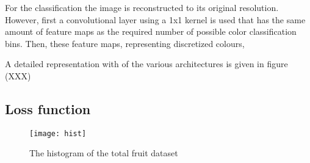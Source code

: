 {For the classification the image is reconstructed to its original resolution. However, first a convolutional layer using a 1x1 kernel is used that has the same amount of feature maps as the required number of possible color classification bins. Then, these feature maps, representing discretized colours, %


A detailed representation with of the various architectures is given in figure {\color{red}(XXX)}}

\subsection{Loss function}

\begin{wrapfigure}{R}{0.5\textwidth}
	\vspace{-20pt}
	\begin{center}
		\texttt{[image: hist]}
	\end{center}
	\caption{\color{red} The histogram of the total fruit dataset}
	\vspace{-10pt}
\end{wrapfigure}





